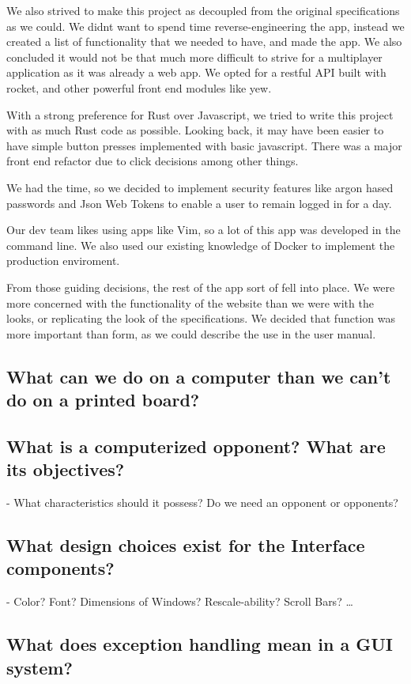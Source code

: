 \documentclass[letterpaper]{article}
\begin{document}
We also strived to make this project as decoupled from the original specifications as we could. We didnt want to spend time reverse-engineering the app, instead we created a list of functionality that we needed to have, and made the app. We also concluded it would not be that much more difficult to strive for a multiplayer application as it was already a web app. We opted for a restful API built with rocket, and other powerful front end modules like yew.

With a strong preference for Rust over Javascript, we tried to write this project with as much Rust code as possible. Looking back, it may have been easier to have simple button presses implemented with basic javascript. There was a major front end refactor due to click decisions among other things.

We had the time, so we decided to implement security features like argon hased passwords and Json Web Tokens to enable a user to remain logged in for a day.


Our dev team likes using apps like Vim, so a lot of this app was developed in the command line. We also used our existing knowledge of Docker to implement the production enviroment.


From those guiding decisions, the rest of the app sort of fell into place. We were more concerned with the functionality of the website than we were with the looks, or replicating the look of the specifications. We decided that function was more important than form, as we could describe the use in the user manual.

\subsection{What can we do on a computer than we can’t do on a printed board?}

\subsection{What is a computerized opponent? What are its objectives?}
- What characteristics should it possess? Do we need an opponent or opponents?


\subsection{What design choices exist for the Interface components?}
- Color? Font? Dimensions of Windows? Rescale-ability? Scroll Bars? \dots

\subsection{What does exception handling mean in a GUI system?}
\end{document}
